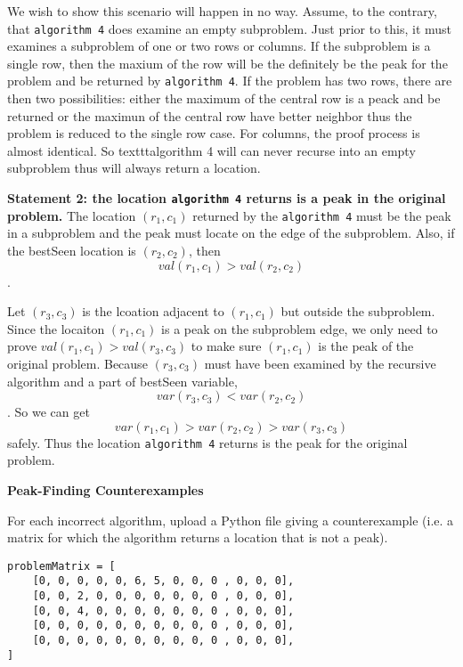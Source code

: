 \documentclass[12pt,twoside]{article}
\begin{document}
\begin{problems}
We wish to show this scenario will happen in no way. Assume, to the contrary, that \texttt{algorithm 4} does examine an empty subproblem. Just prior to this, it must examines a subproblem of one or two rows or columns. If the subproblem is a single row, then the maxium of the row will be the definitely be the peak for the problem and be returned by \texttt{algorithm 4}. If the problem  has two rows, there are then two possibilities: either the maximum of the central row is a peack and be returned or the maximun of the central row have better neighbor thus the problem is reduced to the single row case.  For columns, the proof process is almost identical.  So texttt{algorithm 4 will can never recurse into an  empty subproblem thus will always return a location.} \par

\textbf{Statement 2: the location \texttt{algorithm 4} returns is a peak in the original problem.} The location $(r_1, c_1)$ returned by the \texttt{algorithm 4} must be the peak in a subproblem and the peak must locate on the edge of the subproblem.  Also, if the bestSeen location is $(r_2, c_2)$, then $$ val(r_1, c_1) > val(r_2, c_2) $$ .  \par
Let $(r_3, c_3)$ is the lcoation adjacent to $(r_1, c_1)$ but outside the subproblem. Since the locaiton $(r_1, c_1)$ is a peak on the subproblem edge, we only need to prove $val(r_1, c_1) >  val(r_3, c_3)$ to make sure $(r_1, c_1)$ is the peak of the original problem. Because $(r_3, c_3)$                                                                                                                                                                                                                                                                            must have been examined by the recursive algorithm and a part of bestSeen variable,  $$ var(r_3, c_3) < var(r_2, c_2)$$.  So we can get $$ var(r_1, c_1) > var(r_2, c_2) > var(r_3, c_3) $$ safely. Thus the location \texttt{algorithm 4} returns is the peak for the original problem.
\fi

\problem {} \textbf{Peak-Finding Counterexamples}

For each incorrect algorithm,
upload a Python file giving a counterexample
(i.e. a matrix for which the algorithm returns a location
that is not a peak).

\ifsolution {}
\begin{verbatim}
problemMatrix = [
    [0, 0, 0, 0, 0, 6, 5, 0, 0, 0 , 0, 0, 0],
    [0, 0, 2, 0, 0, 0, 0, 0, 0, 0 , 0, 0, 0],
    [0, 0, 4, 0, 0, 0, 0, 0, 0, 0 , 0, 0, 0],
    [0, 0, 0, 0, 0, 0, 0, 0, 0, 0 , 0, 0, 0],
    [0, 0, 0, 0, 0, 0, 0, 0, 0, 0 , 0, 0, 0],
]


\end{verbatim}
\fi

\end{problems}
\end{document}
